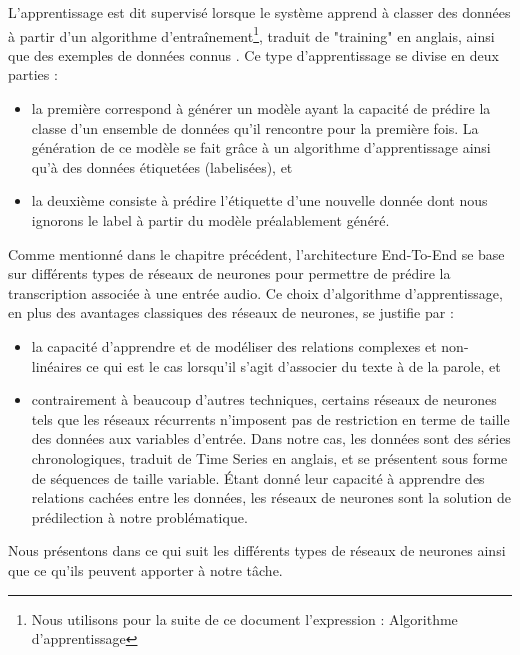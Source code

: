 L'apprentissage est dit supervisé lorsque le système apprend à classer des données à partir d'un algorithme d'entraînement\footnote{Nous utilisons pour la suite de ce document l'expression : Algorithme d'apprentissage}, traduit de "training" en anglais, ainsi que des exemples de données connus \cite{supervised}. Ce type d'apprentissage se divise en deux parties :
\begin{itemize}
    \item la première correspond à générer un modèle ayant la capacité de prédire la classe d'un ensemble de données qu'il rencontre pour la première fois. La génération de ce modèle se fait grâce à un algorithme d'apprentissage ainsi qu'à des données étiquetées (labelisées), et
    \item la deuxième consiste à prédire l'étiquette d'une nouvelle donnée dont nous ignorons le label à partir du modèle préalablement généré. \\
\end{itemize}

Comme mentionné dans le chapitre précédent, l'architecture End-To-End se base sur différents types de réseaux de neurones pour permettre de prédire la transcription associée à une entrée audio. Ce choix d'algorithme d'apprentissage, en plus des avantages classiques des réseaux de neurones, se justifie par :\\
\begin{itemize}
    \item la capacité d'apprendre et de modéliser des relations complexes et non-linéaires ce qui est le cas lorsqu'il s'agit d'associer du texte à de la parole, et
    \item contrairement à beaucoup d'autres techniques, certains réseaux de neurones tels que les réseaux récurrents n'imposent pas de restriction en terme de taille des données aux variables d'entrée. Dans notre cas, les données sont des séries chronologiques, traduit de Time Series en anglais, et se présentent sous forme de séquences de taille variable. Étant donné leur capacité à apprendre des relations cachées entre les données, les réseaux de neurones sont la solution de prédilection à notre problématique. \\
\end{itemize}

Nous présentons dans ce qui suit les différents types de réseaux de neurones ainsi que ce qu'ils peuvent apporter à notre tâche.

